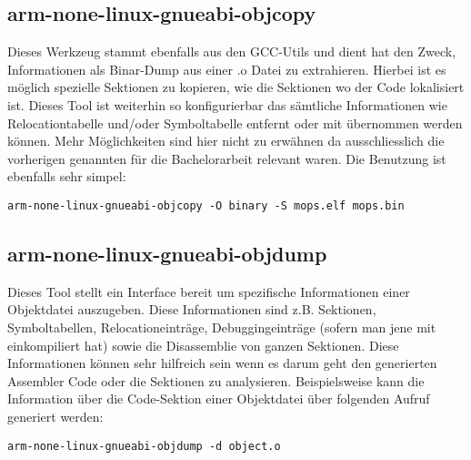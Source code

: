 \subsection{arm-none-linux-gnueabi-objcopy}
\label{tools:copy}
Dieses Werkzeug stammt ebenfalls aus den GCC-Utils und dient hat den Zweck, Informationen als Binar-Dump aus einer .o Datei zu extrahieren. Hierbei ist es m\"oglich spezielle Sektionen zu kopieren, wie die Sektionen wo der Code lokalisiert ist. Dieses Tool ist weiterhin so konfigurierbar das s\"amtliche Informationen wie Relocationtabelle und/oder Symboltabelle entfernt oder mit \"ubernommen werden k\"onnen. Mehr M\"oglichkeiten sind hier nicht zu erw\"ahnen da ausschliesslich die vorherigen genannten f\"ur die Bachelorarbeit relevant waren. Die Benutzung ist ebenfalls sehr simpel:
\begin{lstlisting}[caption={Objektkopie in Bin\"arformat}]
arm-none-linux-gnueabi-objcopy -O binary -S mops.elf mops.bin
\end{lstlisting}

\subsection{arm-none-linux-gnueabi-objdump}
Dieses Tool stellt ein Interface bereit um spezifische Informationen einer Objektdatei auszugeben. Diese Informationen sind z.B. Sektionen, Symboltabellen, Relocationeintr\"age, Debuggingeintr\"age (sofern man jene mit einkompiliert hat) sowie die Disassemblie von ganzen Sektionen. Diese Informationen k\"onnen sehr hilfreich sein wenn es darum geht den generierten Assembler Code oder die Sektionen zu analysieren. Beispielsweise kann die Information \"uber die Code-Sektion einer Objektdatei \"uber folgenden Aufruf generiert werden:
\begin{lstlisting}[caption={Objdump einer Objektdatei}]
arm-none-linux-gnueabi-objdump -d object.o
\end{lstlisting}

